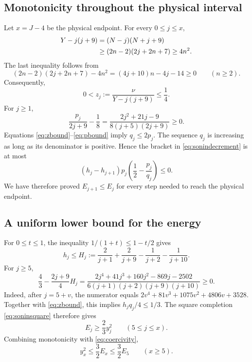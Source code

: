 \documentclass[11pt]{article}
\theoremstyle{remark}
\numberwithin{equation}{section}
\begin{document}
\subsection{Monotonicity throughout the physical interval}

Let $x=J-4$ be the physical endpoint. For every $0\le j\le x$,
\begin{align}
 Y-j(j+9)&=(N-j)(N+j+9)\notag\\
 &\ge(2n-2)(2j+2n+7)\ge4n^2.
 \label{eq:b4gap}
\end{align}
The last inequality follows from
\[
 (2n-2)(2j+2n+7)-4n^2=(4j+10)n-4j-14\ge0
 \qquad(n\ge2).
\]
Consequently,
\begin{equation}
 0<z_j:=\frac{\nu}{Y-j(j+9)}\le\frac14.
 \label{eq:zbound}
\end{equation}
For $j\ge1$,
\begin{equation}
 \frac{p_j}{2j+9}-\frac18
 =\frac{2j^2+21j-9}{8(j+5)(2j+9)}\ge0.
 \label{eq:pbound}
\end{equation}
Equations \eqref{eq:zbound}--\eqref{eq:pbound} imply $q_j\le2p_j$.
The sequence $q_j$ is increasing as long as its denominator is positive.
Hence the bracket in \eqref{eq:sonindecrement} is at most
\begin{equation}
 (h_j-h_{j+1})p_j\left(\frac12-\frac{p_j}{q_j}\right)\le0.
 \label{eq:decrementsign}
\end{equation}
We have therefore proved $E_{j+1}\le E_j$ for every step needed to reach
the physical endpoint.

\subsection{A uniform lower bound for the energy}

For $0\le t\le1$, the inequality $1/(1+t)\le1-t/2$ gives
\begin{equation}
 h_j\le H_j:=\frac2{j+1}+\frac2{j+9}-\frac1{j+2}-\frac1{j+10}.
 \label{eq:hupper}
\end{equation}
For $j\ge5$,
\begin{equation}
 \frac43-\frac{2j+9}{4}H_j
 =\frac{2j^4+41j^3+160j^2-869j-2502}
 {6(j+1)(j+2)(j+9)(j+10)}\ge0.
 \label{eq:coercivitypoly}
\end{equation}
Indeed, after $j=5+v$, the numerator equals
$2v^4+81v^3+1075v^2+4806v+3528$. Together with \eqref{eq:zbound}, this
implies $h_jq_j/4\le1/3$. The square completion
\eqref{eq:soninsquare} therefore gives
\begin{equation}
 \boxed{\qquad E_j\ge\frac23y_j^2\qquad(5\le j\le x).\qquad}
 \label{eq:coercivity}
\end{equation}
Combining monotonicity with \eqref{eq:coercivity},
\begin{equation}
 \boxed{\qquad y_x^2\le\frac32E_x\le\frac32E_5\qquad(x\ge5).\qquad}
 \label{eq:tailreduction}
\end{equation}
\end{document}
